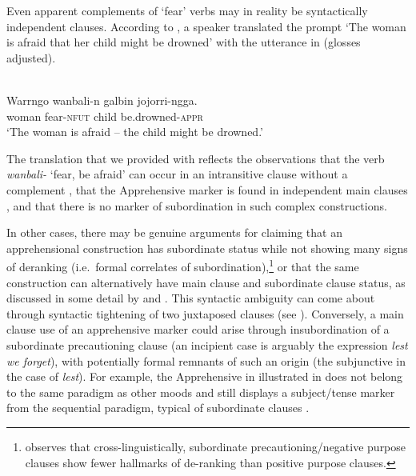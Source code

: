 \documentclass[output=paper,colorlinks,citecolor=brown]{langscibook}
\begin{document}
 Even apparent complements of `fear' verbs may in reality be syntactically independent clauses. According to \citet[619]{tsunoda2011}, a  speaker translated the  prompt `The woman is afraid that her child might be drowned' with the utterance in  (glosses adjusted). 

\ea \label{ex:intro10} 
\\
\gll Warrngo wanbali-n	galbin jojorri-ngga. \\
woman fear-\textsc{nfut} child be.drowned-\textsc{appr} \\
\glt `The woman is afraid -- the child might be drowned.'
\z

\noindent The translation that we provided with  reflects the observations that the verb \textit{wanbali-} `fear, be afraid' can occur in an intransitive clause without a complement \citep[401]{tsunoda2011}, that the  Apprehensive marker is found in independent main clauses \citep[286--287]{tsunoda2011}, and that there is no marker of subordination in such complex constructions. 


In other cases, there may be genuine arguments for claiming that an apprehensional construction has subordinate status while not showing many signs of deranking (i.e.\ formal correlates of subordination),\footnote{\citet[439]{schmidtkebode2012} observes that cross-linguistically, subordinate precautioning/negative purpose clauses show fewer hallmarks of de-ranking than positive purpose clauses.} or that the same construction can alternatively have main clause and subordinate clause status, as discussed in some detail by \citet{lichtenberk1995} and \citet{Dobrushina2006}. This syntactic ambiguity can come about through syntactic tightening of two juxtaposed clauses (see \citealt{chapters/wiemer}). Conversely, a main clause use of an apprehensive marker could arise through insubordination of a subordinate precautioning clause (an incipient case is arguably the  expression \textit{lest we forget}), with potentially formal remnants of such an origin (the subjunctive in the case of \textit{lest}). For example, the Apprehensive in  illustrated in  does not belong to the same paradigm as other moods and still displays a subject/tense marker from the sequential paradigm, typical of subordinate clauses \citep[296]{lichtenberk1995}. 
\end{document}
